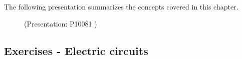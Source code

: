     \addtocounter{footnote}{-0}
    
    \label{m38776*eip-872}The following presentation summarizes the concepts covered in this chapter. 
    \setcounter{subfigure}{0}


	\begin{figure}[H] %
    
        \label{m38776*slidesharemedia}\label{m38776*slideshareflash} { (Presentation:  P10081 )}
      
      \vspace{2pt}
    \vspace{.1in}
        
    

 \end{figure}   

    \addtocounter{footnote}{-0}
    
    





    \label{m38776*cid7}
            \subsection{ Exercises - Electric circuits}
            \nopagebreak
            
